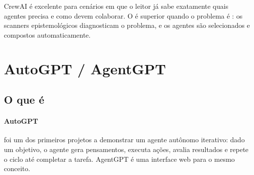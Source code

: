 \begin{table}[htb]
\centering
    \small
\caption{CrewAI vs. OpenCode}
\label{tab:comparacao-crewai}
\end{table}

\noindent CrewAI é excelente para cenários em que o leitor já sabe
exatamente quais agentes precisa e como devem colaborar. O \opencodeeco{}
é superior quando o problema é : os
scanners epistemológicos diagnosticam o problema, e os agentes são
selecionados e compostos automaticamente.

\section{AutoGPT / AgentGPT}
\label{sec:autogpt}
\nivelintermediario

\subsection{O que é}

\paragraph{AutoGPT} foi um dos primeiros projetos a demonstrar um agente
autônomo iterativo: dado um objetivo, o agente gera pensamentos, executa
ações, avalia resultados e repete o ciclo até completar a tarefa. AgentGPT
é uma interface web para o mesmo conceito.

